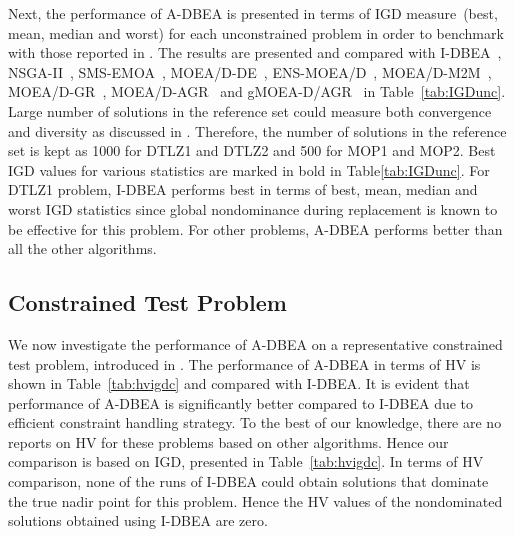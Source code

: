 Next, the performance of A-DBEA is presented in terms of IGD measure~(best, mean, median and worst) for each unconstrained problem in order to benchmark with those reported in \cite{Wang2016adaptive}. The results are presented and compared with I-DBEA~\cite{Asafmany2015}, NSGA-II~\cite{deb2002fast}, SMS-EMOA~\cite{beume2007sms}, MOEA/D-DE~\cite{li2009multiobjective}, ENS-MOEA/D~\cite{zhao2012ens}, MOEA/D-M2M~\cite{liu2014mop}, MOEA/D-GR~\cite{Wang2016adaptive}, MOEA/D-AGR~\cite{Wang2016adaptive} and gMOEA-D/AGR~\cite{Wang2016adaptive} in Table~\ref{tab:IGDunc}. Large number of solutions in the reference set could measure both convergence and diversity as discussed in \cite{Wang2016adaptive}. Therefore, the number of solutions in the reference set is kept as 1000 for DTLZ1 and DTLZ2 and 500 for MOP1 and MOP2. Best IGD values for various statistics are marked in bold in Table\ref{tab:IGDunc}. For DTLZ1 problem, I-DBEA performs best in terms of best, mean, median and worst IGD statistics since global nondominance during replacement is known to be effective for this problem. For other problems, A-DBEA performs better than all the other algorithms. 

\subsection{Constrained Test Problem}

We now investigate the performance of A-DBEA on a representative constrained test problem, introduced in \cite{Deb2014adaptive}. The performance of A-DBEA in terms of HV is shown in Table~\ref{tab:hvigdc} and compared with I-DBEA. It is evident that performance of A-DBEA is significantly better compared to I-DBEA due to efficient constraint handling strategy. To the best of our knowledge, there are no reports on HV for these problems based on other algorithms. Hence our comparison is based on IGD, presented in Table~\ref{tab:hvigdc}. In terms of HV comparison, none of the runs of I-DBEA could obtain solutions that dominate the true nadir point for this problem. Hence the HV values of the nondominated solutions obtained using I-DBEA are zero. 

